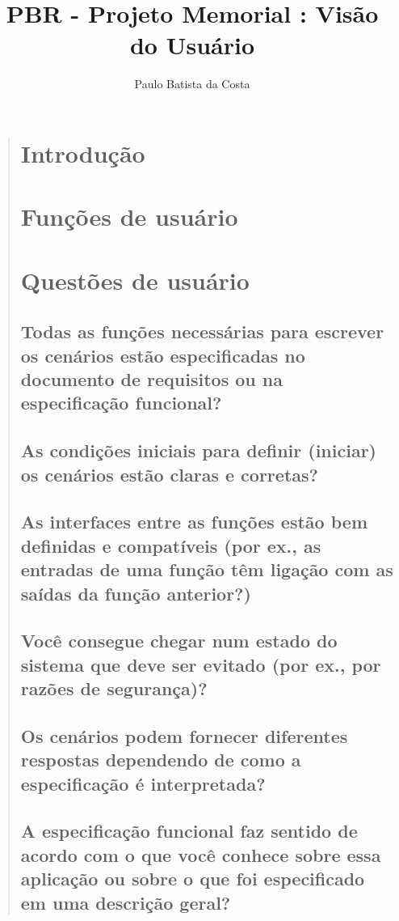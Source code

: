 \documentclass[12pt,a4paper]{report}
\author{Paulo Batista da Costa}
\title{PBR - Projeto Memorial : Visão do Usuário}
\begin{document}
\maketitle
\tableofcontents
\begin{quotation}
\newpage
\section{Introdução}
\section{Funções de usuário}
\section{Questões de usuário}
\subsection{Todas as funções necessárias para escrever os cenários estão especificadas no documento de requisitos ou na especificação funcional?}
\subsection{As condições iniciais para definir (iniciar) os cenários estão claras e corretas?}
\subsection{As interfaces entre as funções estão bem definidas e compatíveis (por ex., as entradas de uma função têm ligação com as saídas da função anterior?)}
\subsection{Você consegue chegar num estado do sistema que deve ser evitado (por ex., por razões de segurança)?}
\subsection{Os cenários podem fornecer diferentes respostas dependendo de como a especificação é interpretada?}
\subsection{A especificação funcional faz sentido de acordo com o que você conhece sobre essa aplicação ou sobre o que foi especificado em uma descrição geral?}
\end{quotation}
\end{document}
